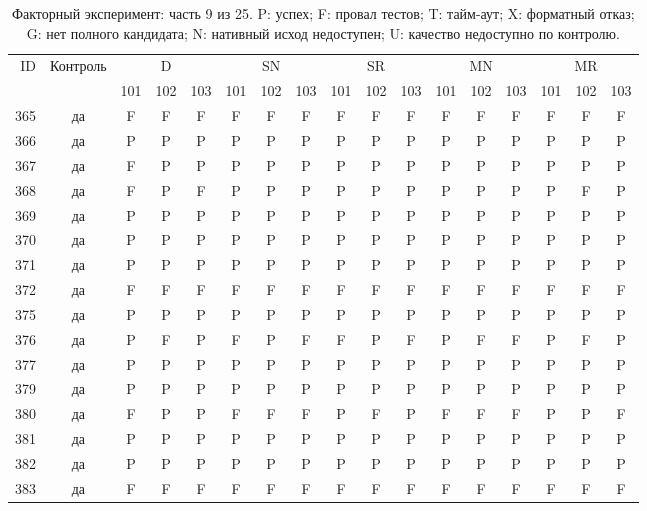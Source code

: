 \begin{table}[p]\centering\footnotesize
\setlength{\tabcolsep}{3pt}
\caption{Факторный эксперимент: часть 9 из 25. P: успех; F: провал тестов; T: тайм-аут; X: форматный отказ; G: нет полного кандидата; N: нативный исход недоступен; U: качество недоступно по контролю.}
\begin{tabular*}{\textwidth}{@{\extracolsep{\fill}}rcccccccccccccccc}\toprule
ID & Контроль & \multicolumn{3}{c}{D} & \multicolumn{3}{c}{SN} & \multicolumn{3}{c}{SR} & \multicolumn{3}{c}{MN} & \multicolumn{3}{c}{MR}\\
\cmidrule(lr){3-5}\cmidrule(lr){6-8}\cmidrule(lr){9-11}\cmidrule(lr){12-14}\cmidrule(lr){15-17}
 & & 101 & 102 & 103 & 101 & 102 & 103 & 101 & 102 & 103 & 101 & 102 & 103 & 101 & 102 & 103\\\midrule
365 & да & F & F & F & F & F & F & F & F & F & F & F & F & F & F & F\\
366 & да & P & P & P & P & P & P & P & P & P & P & P & P & P & P & P\\
367 & да & F & P & P & P & P & P & P & P & P & P & P & P & P & P & P\\
368 & да & F & P & F & P & P & P & P & P & P & P & P & P & P & F & P\\
369 & да & P & P & P & P & P & P & P & P & P & P & P & P & P & P & P\\
370 & да & P & P & P & P & P & P & P & P & P & P & P & P & P & P & P\\
371 & да & P & P & P & P & P & P & P & P & P & P & P & P & P & P & P\\
372 & да & F & F & F & F & F & F & F & F & F & F & F & F & F & F & F\\
375 & да & P & P & P & P & P & P & P & P & P & P & P & P & P & P & P\\
376 & да & P & F & P & F & P & F & F & P & F & P & F & F & P & F & P\\
377 & да & P & P & P & P & P & P & P & P & P & P & P & P & P & P & P\\
379 & да & P & P & P & P & P & P & P & P & P & P & P & P & P & P & P\\
380 & да & F & P & P & F & F & F & P & F & P & F & F & F & P & P & F\\
381 & да & P & P & P & P & P & P & P & P & P & P & P & P & P & P & P\\
382 & да & P & P & P & P & P & P & P & P & P & P & P & P & P & P & P\\
383 & да & F & F & F & F & F & F & F & F & F & F & F & F & F & F & F\\

\end{tabular*}
\end{table}
